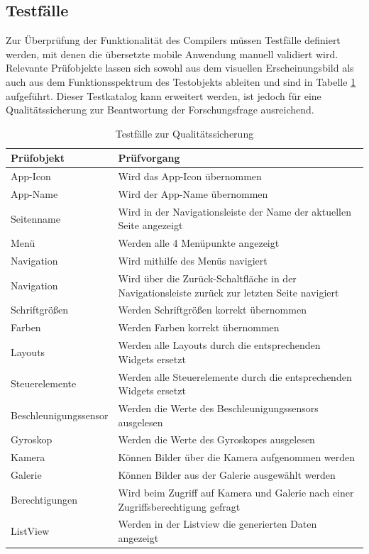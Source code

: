 \subsection{Testfälle}
Zur Überprüfung der Funktionalität des Compilers müssen Testfälle definiert werden,  mit denen die übersetzte mobile Anwendung manuell validiert wird.  Relevante Prüfobjekte lassen sich sowohl aus dem visuellen  Erscheinungsbild als auch aus dem Funktionsspektrum des Testobjekts ableiten und sind in Tabelle \ref{tab:Testapp} aufgeführt.  Dieser Testkatalog kann erweitert werden,  ist jedoch für eine Qualitätssicherung zur Beantwortung der Forschungsfrage ausreichend.  
\newpage

\begin{table}[!ht]
\begin{tabularx}{\textwidth}{|l|X|}
\hline
 \textbf{Prüfobjekt} & \textbf{Prüfvorgang}  \\  
\hline
App-Icon	           					& Wird das App-Icon übernommen                       			 		\\ 
App-Name          					& Wird der App-Name übernommen                      		 \\ 
Seitenname  	         				& Wird in der Navigationsleiste der Name der aktuellen Seite angezeigt               \\ 
Menü         			  				& Werden alle 4 Menüpunkte angezeigt                     			 \\ 
Navigation         			  		& Wird mithilfe des Menüs navigiert	\\ 
Navigation          					& Wird über die \glq Zurück-Schaltfläche\grq{} in der Navigationsleiste zurück zur letzten Seite navigiert                   			 \\ 
Schriftgrößen			         	& Werden  Schriftgrößen korrekt übernommen                 			 \\ 
Farben						         	& Werden  Farben korrekt übernommen                 			 \\ 
Layouts 								& Werden alle Layouts durch die entsprechenden Widgets ersetzt              			 \\ 
Steuerelemente						& Werden alle Steuerelemente durch die entsprechenden Widgets ersetzt               			 \\ 
Beschleunigungssensor        	& Werden die Werte des Beschleunigungssensors ausgelesen          			 \\ 
Gy­ro­s­kop						         & Werden die Werte des Gyroskopes ausgelesen                            			 \\ 
Kamera			         				& Können Bilder über die Kamera aufgenommen werden\\ 
Galerie			         				& Können Bilder aus der Galerie ausgewählt werden                			 \\ 
Berechtigungen			         	& Wird beim Zugriff auf Kamera und Galerie nach einer Zugriffsberechtigung gefragt \\ 
ListView					         	& Werden in der Listview die generierten Daten angezeigt                   			 \\ 
\hline
\end{tabularx}
	  \caption{Testfälle zur Qualitätssicherung}
 \label{tab:Testapp}
\end{table}

